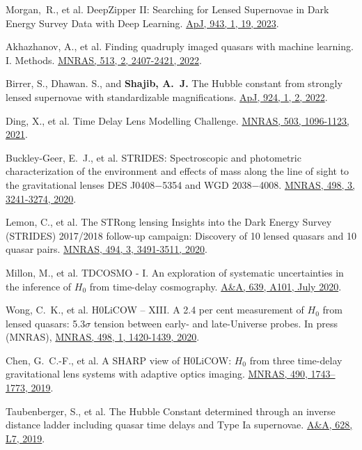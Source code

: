 \documentclass[margin, line]{res}
\begin{document}
\begin{resume}
\begin{etaremune}
	\item Morgan,~R., et al. DeepZipper II: Searching for Lensed Supernovae in Dark Energy Survey Data with Deep Learning. \href{https://ui.adsabs.harvard.edu/abs/2023ApJ...943...19M/abstract}{ApJ, 943, 1, 19, 2023}.
	\item Akhazhanov, A., et al. Finding quadruply imaged quasars with machine learning. I. Methods. \href{https://ui.adsabs.harvard.edu/abs/2022MNRAS.tmp..904A/abstract}{MNRAS, 513, 2, 2407-2421, 2022}.
	\item Birrer, S., Dhawan. S., and \textbf{Shajib, A.~J.} The Hubble constant from strongly lensed supernovae with standardizable magnifications. \href{https://iopscience.iop.org/article/10.3847/1538-4357/ac323a}{ApJ, 924, 1, 2, 2022}.
	\item Ding, X., et al. Time Delay Lens Modelling Challenge. \href{https://ui.adsabs.harvard.edu/abs/2021MNRAS.503.1096D/abstract}{MNRAS, 503, 1096-1123, 2021}.
	\item Buckley-Geer, E.~J., et al. STRIDES: Spectroscopic and photometric characterization of the environment and effects of mass along the line of sight to the gravitational lenses DES J0408$-$5354 and WGD 2038$-$4008. \href{https://ui.adsabs.harvard.edu/abs/2020MNRAS.498.3241B/abstract}{MNRAS, 498, 3, 3241-3274, 2020}.
	\item Lemon, C., et al. The STRong lensing Insights into the Dark Energy Survey (STRIDES) 2017/2018 follow-up campaign: Discovery of 10 lensed quasars and 10 quasar pairs. \href{https://doi.org/10.1093/mnras/staa652}{MNRAS, 494, 3, 3491-3511, 2020}.
	\item Millon, M., et al. TDCOSMO - I. An exploration of systematic uncertainties in the inference of $H_0$ from time-delay cosmography. \href{https://doi.org/10.1051/0004-6361/201937351}{A\&A, 639, A101, July 2020}.
	\item Wong, C.~K., et al. H0LiCOW – XIII. A 2.4 per cent measurement of $H_0$ from lensed quasars: 5.3$\sigma$ tension between early- and late-Universe probes. In press (MNRAS), \href{https://doi.org/10.1093/mnras/stz3094}{MNRAS, 498, 1, 1420-1439, 2020}.
	\item Chen, G.~C.-F., et al. A SHARP view of H0LiCOW: $H_0$ from three time-delay gravitational lens systems with adaptive optics imaging. \href{https://academic.oup.com/mnras/article/doi/10.1093/mnras/stz2547/5568378/}{MNRAS, 490, 1743--1773, 2019}.
	\item Taubenberger, S., et al. The Hubble Constant determined through an inverse distance ladder including quasar time delays and Type Ia supernovae. \href{https://www.aanda.org/articles/aa/abs/2019/08/aa35980-19/aa35980-19.html}{A\&A, 628, L7, 2019}.

\end{etaremune}
\end{resume}
\end{document}
